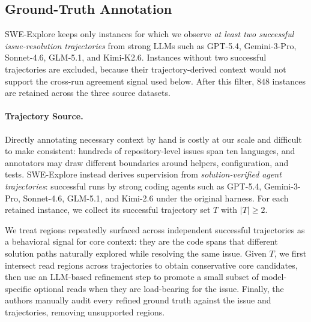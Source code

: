 \subsection{Ground-Truth Annotation}
\label{sec:gt}


SWE-Explore keeps only instances for which we observe \emph{at least two successful issue-resolution trajectories} from strong LLMs such as GPT-5.4, Gemini-3-Pro, Sonnet-4.6, GLM-5.1, and Kimi-K2.6. Instances without two successful trajectories are excluded, because their trajectory-derived context would not support the cross-run agreement signal used below. After this filter, $848$ instances are retained across the three source datasets.

\paragraph{Trajectory Source.}
Directly annotating necessary context by hand is costly at our scale and difficult to make consistent: hundreds of repository-level issues span ten languages, and annotators may draw different boundaries around helpers, configuration, and tests. SWE-Explore instead derives supervision from \emph{solution-verified agent trajectories}: successful runs by strong coding agents such as GPT-5.4, Gemini-3-Pro, Sonnet-4.6, GLM-5.1, and Kimi-2.6 under the original harness. For each retained instance, we collect its successful trajectory set $T$ with $|T| \geq 2$.



We treat regions repeatedly surfaced across independent successful trajectories as a behavioral signal for core context: they are the code spans that different solution paths naturally explored while resolving the same issue. Given $T$, we first intersect read regions across trajectories to obtain conservative core candidates, then use an LLM-based refinement step to promote a small subset of model-specific optional reads when they are load-bearing for the issue. Finally, the authors manually audit every refined ground truth against the issue and trajectories, removing unsupported regions.











